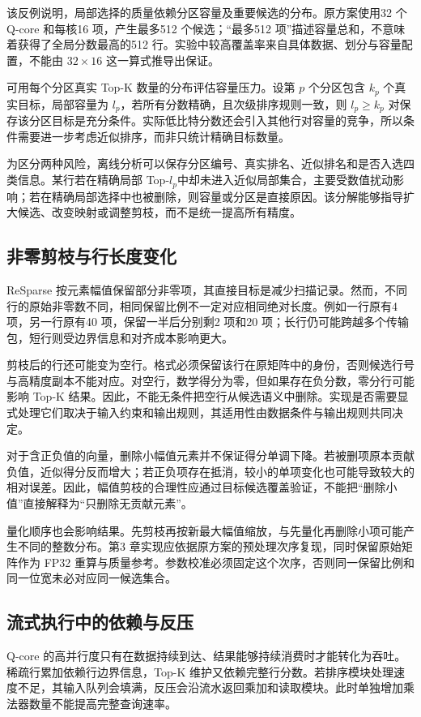 该反例说明，局部选择的质量依赖分区容量及重要候选的分布。原方案使用32 个 Q-core 和每核16 项，产生最多512 个候选；“最多512 项”描述容量总和，不意味着获得了全局分数最高的512 行。实验中较高覆盖率来自具体数据、划分与容量配置，不能由 $32\times16$ 这一算式推导出保证。

可用每个分区真实 Top-K 数量的分布评估容量压力。设第 $p$ 个分区包含 $k_p$ 个真实目标，局部容量为 $l_p$，若所有分数精确，且次级排序规则一致，则 $l_p\geq k_p$ 对保存该分区目标是充分条件。实际低比特分数还会引入其他行对容量的竞争，所以条件需要进一步考虑近似排序，而非只统计精确目标数量。

为区分两种风险，离线分析可以保存分区编号、真实排名、近似排名和是否入选四类信息。某行若在精确局部 Top-$l_p$中却未进入近似局部集合，主要受数值扰动影响；若在精确局部选择中也被删除，则容量或分区是直接原因。该分解能够指导扩大候选、改变映射或调整剪枝，而不是统一提高所有精度。

\subsection{非零剪枝与行长度变化}
ReSparse 按元素幅值保留部分非零项，其直接目标是减少扫描记录。然而，不同行的原始非零数不同，相同保留比例不一定对应相同绝对长度。例如一行原有4 项，另一行原有40 项，保留一半后分别剩2 项和20 项；长行仍可能跨越多个传输包，短行则受边界信息和对齐成本影响更大。

剪枝后的行还可能变为空行。格式必须保留该行在原矩阵中的身份，否则候选行号与高精度副本不能对应。对空行，数学得分为零，但如果存在负分数，零分行可能影响 Top-K 结果。因此，不能无条件把空行从候选语义中删除。实现是否需要显式处理它们取决于输入约束和输出规则，其适用性由数据条件与输出规则共同决定。

对于含正负值的向量，删除小幅值元素并不保证得分单调下降。若被删项原本贡献负值，近似得分反而增大；若正负项存在抵消，较小的单项变化也可能导致较大的相对误差。因此，幅值剪枝的合理性应通过目标候选覆盖验证，不能把“删除小值”直接解释为“只删除无贡献元素”。

量化顺序也会影响结果。先剪枝再按新最大幅值缩放，与先量化再删除小项可能产生不同的整数分布。第3 章实现应依据原方案的预处理次序复现，同时保留原始矩阵作为 FP32 重算与质量参考。参数校准必须固定这个次序，否则同一保留比例和同一位宽未必对应同一候选集合。

\subsection{流式执行中的依赖与反压}
Q-core 的高并行度只有在数据持续到达、结果能够持续消费时才能转化为吞吐。稀疏行累加依赖行边界信息，Top-K 维护又依赖完整行分数。若排序模块处理速度不足，其输入队列会填满，反压会沿流水返回乘加和读取模块。此时单独增加乘法器数量不能提高完整查询速率。

